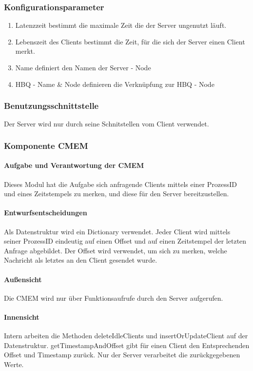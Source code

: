\documentclass{article}
\begin{document}
		\subsubsection{Konfigurationsparameter}
			\begin{enumerate}
    			\item{Latenzzeit bestimmt die maximale Zeit die der Server ungenutzt läuft.}
    			\item{Lebenszeit des Clients bestimmt die Zeit, für die sich der Server einen 
    					Client merkt.}
    			\item{Name definiert den Namen der Server - Node}
    			\item{HBQ - Name \& Node definieren die Verknüpfung zur HBQ - Node}
    		\end{enumerate}
		\subsubsection{Benutzungsschnittstelle}
			Der Server wird nur durch seine Schnitstellen vom Client verwendet.
		\subsubsection{Komponente CMEM}
			\paragraph{Aufgabe und Verantwortung der CMEM}
				Dieses Modul hat die Aufgabe sich anfragende Clients mittels einer ProzessID und eines Zeitstempels zu merken, und diese für den Server bereitzustellen.
			\paragraph{Entwurfsentscheidungen}
				Als Datenstruktur wird ein Dictionary verwendet. Jeder Client wird mittels
				seiner ProzessID eindeutig auf einen Offset und auf einen Zeitstempel der 
				letzten Anfrage abgebildet. Der Offset wird verwendet, um sich zu merken, 
				welche Nachricht als letztes an den Client gesendet wurde.
			\paragraph{Außensicht}
				Die CMEM wird nur über Funktionsaufrufe durch den Server aufgerufen.
			\paragraph{Innensicht}
				Intern arbeiten die Methoden deleteIdleClients und insertOrUpdateClient
				auf der Datenstruktur. getTimestampAndOffset gibt für einen Client den Entsprechenden
				Offset und Timestamp zurück. Nur der Server verarbeitet die zurückgegebenen Werte.
\end{document}
